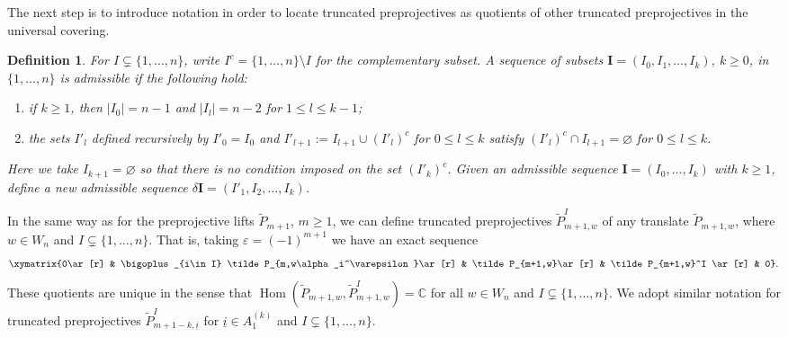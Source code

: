 \documentclass{amsart}
\newtheorem{definition}[theorem]{Definition}
\numberwithin{equation}{section}
\newcommand{\bfI}{\mathbf{I}}
\newcommand{\ui}{{\underline i}}
\newcommand{\CC}{\mathbb{C}}
\newcommand{\Hom}{\operatorname{Hom}}
\newcommand{\ses}[3]{\xymatrix{0\ar[r] & #1\ar[r] & #2\ar[r] & #3 \ar[r] & 0}}
\begin{document}
The next step is to introduce notation in order to locate truncated preprojectives as quotients of other truncated preprojectives in the universal covering.
\begin{definition}
  For $I\subsetneq\{1,\ldots,n\}$, write $I^c=\{1,\ldots,n\}\setminus I$ for the complementary subset.
  A sequence of subsets $\bfI=(I_0,I_1,\ldots,I_k)$, $k\ge0$, in $\{1,\ldots,n\}$ is \emph{admissible} if the following hold:
  \begin{enumerate}
    \item if $k\ge1$, then $|I_0|=n-1$ and $|I_l|=n-2$ for $1\le l\le k-1$;
    \item the sets $I'_l$ defined recursively by $I'_0=I_0$ and $I'_{l+1}:=I_{l+1}\cup (I'_l)^c$ for $0\le l\le k$ satisfy $(I'_l)^c\cap I_{l+1}=\varnothing$ for $0\le l\le k$.
  \end{enumerate}
  Here we take $I_{k+1}=\varnothing$ so that there is no condition imposed on the set $(I'_k)^c$.
  Given an admissible sequence $\bfI=(I_0,\ldots,I_k)$ with $k\ge1$, define a new admissible sequence $\delta\bfI=(I'_1,I_2,\ldots,I_k)$.
\end{definition}

In the same way as for the preprojective lifts $\tilde P_{m+1}$, $m\ge1$, we can define truncated preprojectives $\tilde P_{m+1,w}^I$ of any translate $\tilde P_{m+1,w}$, where $w\in W_n$ and $I\subsetneq\{1,\ldots,n\}$.
That is, taking $\varepsilon=(-1)^{m+1}$ we have an exact sequence
\[\ses{\bigoplus_{i\in I} \tilde P_{m,w\alpha_i^\varepsilon}}{\tilde P_{m+1,w}}{\tilde P_{m+1,w}^I}.\]
These quotients are unique in the sense that $\Hom(\tilde P_{m+1,w},\tilde P_{m+1,w}^I)=\CC$ for all $w\in W_n$ and $I\subsetneq\{1,\ldots,n\}$.
We adopt similar notation for truncated preprojectives $\tilde P_{m+1-k,\ui}^I$ for $\ui\in A_1^{(k)}$ and $I\subsetneq\{1,\ldots,n\}$.
\end{document}
